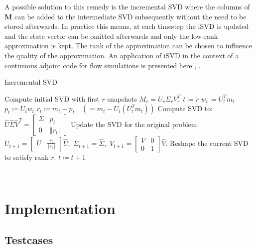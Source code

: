 \documentclass[10pt]{article}
\begin{document}
A possible solution to this remedy is the incremental SVD where the columns of \textbf{M} can be added to the intermediate SVD subsequently without the need to be stored afterwards. In practice this means, at each timestep the iSVD is updated and the state vector can be omitted afterwards and only the low-rank approximation is kept. The rank of the approximation can be chosen to influence the quality of the approximation. An application of iSVD in the context of a continuous adjoint code for flow simulations is presented here \cite{Vezyris2014}, \cite{Vezyris2015}.
\begin{algorithm}
\caption{Incremental SVD}
\begin{algorithmic}
\State Compute initial SVD with first $r$ snapshots
\State $M_r = U_r \Sigma_r V_r^T$
\State $t \coloneqq r$
	\State $w_t \coloneqq U_t^T m_t$
	\State $p_t \coloneqq U_t w_t$
	\State $r_t \coloneqq m_t - p_t \quad (= m_t - U_t\left( U_t^T m_t \right))$ 
	\State Compute SVD to:
	\State
	$
	\hat{U} \hat{\Sigma} \hat{V}^T = 
	\begin{bmatrix}
	\Sigma & p_t \\
	0 & \left\Vert r_t \right\Vert
	\end{bmatrix}
	$
	\State Update the SVD for the original problem:
	\State 
	$U_{t+1} = \begin{bmatrix} U & \frac{r_t}{\left\Vert r_t \right\Vert} \end{bmatrix} \hat{U}$,\,
	$\Sigma_{t+1} = \hat{\Sigma}$,\,
	$V_{t+1} = \begin{bmatrix} V & 0 \\ 0 & 1 \end{bmatrix} \hat{V}$.
	\State Reshape the current SVD to satisfy rank $r$.
	\State $t \coloneqq t+1$
\EndWhile
\end{algorithmic}
\end{algorithm}
\\


\section{Implementation}
\subsection{Testcases}
\end{document}
